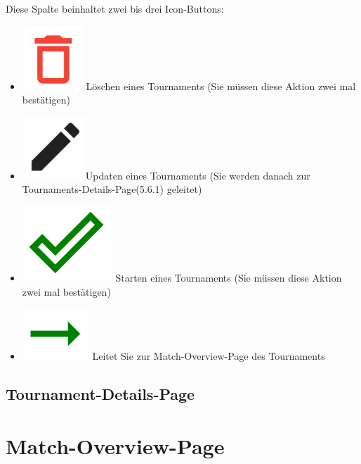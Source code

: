 Diese Spalte beinhaltet zwei bis drei Icon-Buttons:
\begin{itemize}
    \item \includegraphics[scale=0.3]{pics/user-guide/delete-icon.PNG} Löschen eines Tournaments (Sie müssen diese Aktion zwei mal bestätigen)
    \item \includegraphics[scale=0.3]{pics/user-guide/edit-icon.PNG}Updaten eines Tournaments (Sie werden danach zur Tournaments-Details-Page(5.6.1) geleitet)
    \item \includegraphics[scale=0.3]{pics/user-guide/submit-icon.PNG} Starten eines Tournaments (Sie müssen diese Aktion zwei mal bestätigen)
    \item \includegraphics[scale=0.3]{pics/user-guide/go-to-icon.PNG} Leitet Sie zur Match-Overview-Page des Tournaments
\end{itemize}

\subsection{Tournament-Details-Page}

\newpage
\section{Match-Overview-Page} 